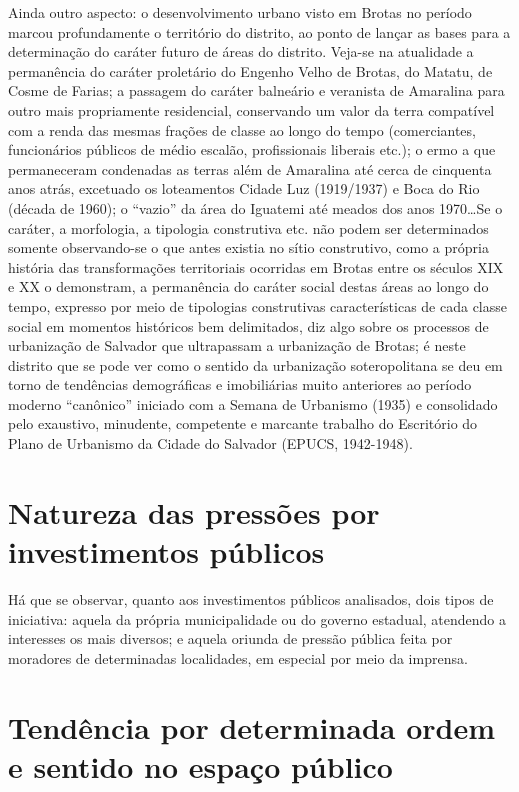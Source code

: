 Ainda outro aspecto: o desenvolvimento urbano visto em Brotas no período marcou profundamente o território do distrito, ao ponto de lançar as bases para a determinação do caráter futuro de áreas do distrito. Veja-se na atualidade a permanência do caráter proletário do Engenho Velho de Brotas, do Matatu, de Cosme de Farias; a passagem do caráter balneário e veranista de Amaralina para outro mais propriamente residencial, conservando um valor da terra compatível com a renda das mesmas frações de classe ao longo do tempo (comerciantes, funcionários públicos de médio escalão, profissionais liberais etc.); o ermo a que permaneceram condenadas as terras além de Amaralina até cerca de cinquenta anos atrás, excetuado os loteamentos Cidade Luz (1919/1937) e Boca do Rio (década de 1960); o ``vazio'' da área do Iguatemi até meados dos anos 1970\dots Se o caráter, a morfologia, a tipologia construtiva etc. não podem ser determinados somente observando-se o que antes existia no sítio construtivo, como a própria história das transformações territoriais ocorridas em Brotas entre os séculos XIX e XX o demonstram, a permanência do caráter social destas áreas ao longo do tempo, expresso por meio de tipologias construtivas características de cada classe social em momentos históricos bem delimitados, diz algo sobre os processos de urbanização de Salvador que ultrapassam a urbanização de Brotas; é neste distrito que se pode ver como o sentido da urbanização soteropolitana se deu em torno de tendências demográficas e imobiliárias muito anteriores ao período moderno ``canônico'' iniciado com a Semana de Urbanismo (1935) e consolidado pelo exaustivo, minudente, competente e marcante trabalho do Escritório do Plano de Urbanismo da Cidade do Salvador (EPUCS, 1942-1948).

\section{Natureza das pressões por investimentos públicos}\label{subsec:3.3.2}

Há que se observar, quanto aos investimentos públicos analisados, dois tipos de iniciativa: aquela da própria municipalidade ou do governo estadual, atendendo a interesses os mais diversos; e aquela oriunda de pressão pública feita por moradores de determinadas localidades, em especial por meio da imprensa.

\section{Tendência por determinada ordem e sentido no espaço público}\label{subsec:3.3.3}




